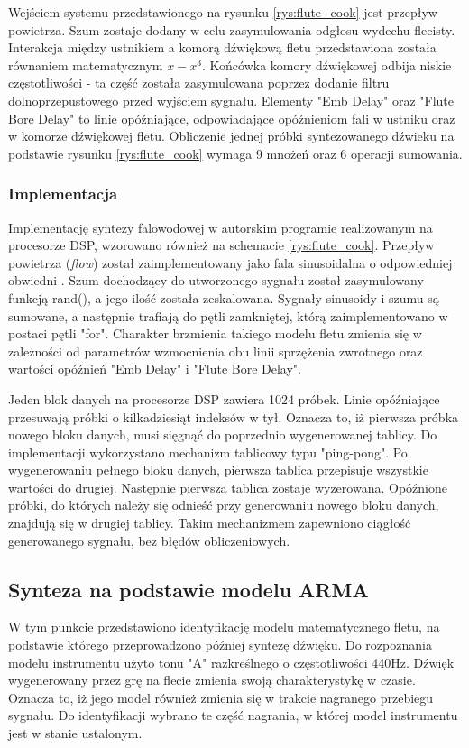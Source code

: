 Wejściem systemu przedstawionego na rysunku \ref{rys:flute_cook} jest przepływ powietrza. Szum zostaje dodany w celu zasymulowania odgłosu wydechu flecisty. 
Interakcja między ustnikiem a komorą dźwiękową fletu przedstawiona została równaniem matematycznym $x-x^3$. Końcówka komory dźwiękowej odbija niskie częstotliwości - ta część została zasymulowana poprzez dodanie filtru dolnoprzepustowego przed wyjściem sygnału. Elementy "Emb Delay" oraz "Flute Bore Delay" to linie opóźniające, odpowiadające opóźnieniom fali w ustniku oraz w komorze dźwiękowej fletu. 
Obliczenie jednej próbki syntezowanego dźwieku na podstawie rysunku \ref{rys:flute_cook} wymaga 9 mnożeń oraz 6 operacji sumowania.

\subsubsection{Implementacja}
Implementację syntezy falowodowej w autorskim programie realizowanym na procesorze DSP,  wzorowano również na schemacie \ref{rys:flute_cook}. Przepływ powietrza (\emph{flow}) został zaimplementowany jako fala sinusoidalna o odpowiedniej obwiedni \cite{flute_prezka}. Szum dochodzący do utworzonego sygnału został zasymulowany funkcją rand(), a jego ilość została zeskalowana. Sygnały sinusoidy i szumu są sumowane, a następnie trafiają do pętli zamkniętej, którą zaimplementowano w postaci pętli "for". Charakter brzmienia takiego modelu fletu zmienia się w zależności od parametrów wzmocnienia obu linii sprzężenia zwrotnego oraz wartości opóźnień "Emb Delay" i "Flute Bore Delay".

Jeden blok danych na procesorze DSP zawiera 1024 próbek. Linie opóźniające przesuwają próbki o kilkadziesiąt indeksów w tył. Oznacza to, iż pierwsza próbka nowego bloku danych, musi sięgnąć do poprzednio wygenerowanej tablicy. Do implementacji wykorzystano mechanizm tablicowy typu "ping-pong". Po wygenerowaniu pełnego bloku danych, pierwsza tablica przepisuje wszystkie wartości do drugiej. Następnie pierwsza tablica zostaje wyzerowana. Opóźnione próbki, do których należy się odnieść przy generowaniu nowego bloku danych, znajdują się w drugiej tablicy. Takim mechanizmem zapewniono ciągłość generowanego sygnału, bez błędów obliczeniowych.

\subsection{Synteza na podstawie modelu ARMA}
W tym punkcie przedstawiono identyfikację modelu matematycznego fletu, na podstawie którego przeprowadzono później syntezę dźwięku. Do rozpoznania modelu instrumentu użyto tonu "A" razkreślnego o częstotliwości 440Hz. Dźwięk wygenerowany przez grę na flecie zmienia swoją charakterystykę w czasie. Oznacza to, iż jego model również zmienia się w trakcie nagranego przebiegu sygnału. Do identyfikacji wybrano te część nagrania, w której model instrumentu jest w stanie ustalonym.

